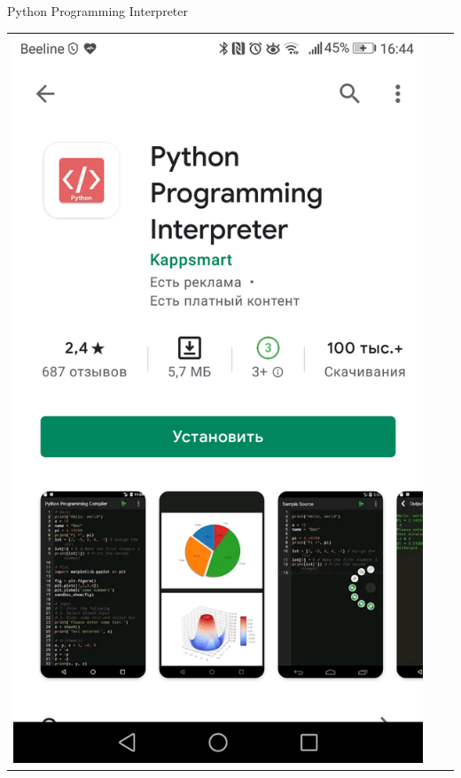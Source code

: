 \documentclass[12pt]{beamer}
\begin{document}
\begin{frame}{Python Programming Interpreter}
\vspace{0.9cm}
\begin{center}
	\begin{tabular}{ccc}
		\includegraphics[scale=0.083]{image/interpreter_01.PNG} & 		

\end{tabular}
\end{center}
\end{frame}
\end{document}
